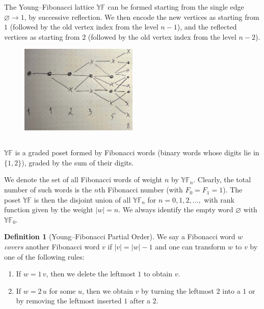 \documentclass[letterpaper,11pt,oneside,reqno]{article}
\numberwithin{equation}{section}
\theoremstyle{definition}
\newtheorem{definition}[proposition]{Definition}
\begin{document}
The Young--Fibonacci lattice $\mathbb{YF}$
can be formed starting from the single edge $\varnothing\to 1$,
by successive reflection. We then encode the new vertices as starting from $1$ (followed by the
old vertex index from the level $n-1$), and the
reflected vertices as starting from $2$ (followed by the
old vertex index from the level $n-2$).

\begin{figure}[htp]
	\centering
	\includegraphics[width=0.5\textwidth]{YF}
\end{figure}

\subsection{}

$\mathbb{YF}$ is a graded poset formed
by Fibonacci words (binary words whose digits lie in
$\{1,2\}$), graded by the sum of their digits.

We denote the set of all Fibonacci words of weight $n$ by
$\mathbb{YF}_n$. Clearly, the total number of such words is
the $n$th Fibonacci number (with $F_0 = F_1 = 1$). The poset
$\mathbb{YF}$ is then the disjoint union of all
$\mathbb{YF}_n$ for $n = 0,1,2,\ldots,$ with rank function
given by the weight $|w| = n$. We always identify the empty
word $\varnothing$ with $\mathbb{YF}_0$.

\begin{definition}[Young--Fibonacci Partial Order]
\label{def:YF-partial-order}
We say a Fibonacci word $w$ \emph{covers} another Fibonacci word $v$ if $|v| = |w| - 1$ and one can transform $w$ to $v$ by one of the following rules:
\begin{enumerate}
\item If $w = 1 \,v$, then we delete the leftmost $1$ to obtain $v$.
\item If $w = 2 \,u$ for some $u$, then we obtain $v$ by turning the leftmost $2$ into a $1$ or by removing the leftmost inserted $1$ after a $2$.
\end{enumerate}
\end{definition}
\end{document}
